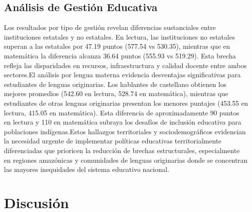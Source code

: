 \documentclass[conference]{IEEEtran}
\begin{document}
\subsection{Análisis de Gestión Educativa}
Los resultados por tipo de gestión revelan diferencias sustanciales entre instituciones estatales y no estatales. En lectura, las instituciones no estatales superan a las estatales por 47.19 puntos (577.54 vs 530.35), mientras que en matemática la diferencia alcanza 36.64 puntos (555.93 vs 519.29). Esta brecha refleja las disparidades en recursos, infraestructura y calidad docente entre ambos sectores.El análisis por lengua materna evidencia desventajas significativas para estudiantes de lenguas originarias. Los hablantes de castellano obtienen los mejores promedios (542.60 en lectura, 528.74 en matemática), mientras que estudiantes de otras lenguas originarias presentan los menores puntajes (453.55 en lectura, 415.05 en matemática). Esta diferencia de aproximadamente 90 puntos en lectura y 110 en matemática subraya los desafíos de inclusión educativa para poblaciones indígenas.Estos hallazgos territoriales y sociodemográficos evidencian la necesidad urgente de implementar políticas educativas territorialmente diferenciadas que prioricen la reducción de brechas estructurales, especialmente en regiones amazónicas y comunidades de lenguas originarias donde se concentran las mayores inequidades del sistema educativo nacional. 

\section{Discusión}
\end{document}
